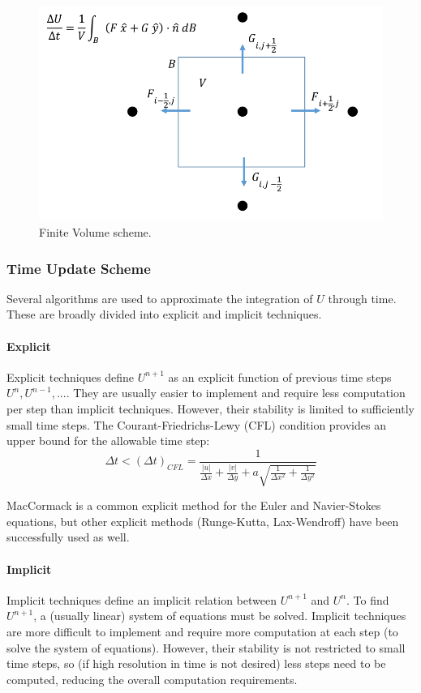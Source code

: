 \documentclass[paper=a4, fontsize=11pt]{scrartcl}
\numberwithin{equation}{section}        %
\numberwithin{figure}{section}          %
\numberwithin{table}{section}               %
\begin{document}
\begin{figure}[H]
    \centering
    \includegraphics[width = 0.8 \textwidth]{figures/finite_volume.png}
    \caption{Finite Volume scheme.}
    \label{fig:finite_volume}
\end{figure}

\subsubsection{Time Update Scheme}
Several algorithms are used to approximate the integration of $U$ through time. These are broadly divided into explicit and implicit techniques.

\paragraph{Explicit}
Explicit techniques define $U^{n+1}$ as an explicit function of previous time steps $U^{n}, U^{n-1}, ...$. They are usually easier to implement and require less computation per step than implicit techniques. However, their stability is limited to sufficiently small time steps. The Courant-Friedrichs-Lewy (CFL) condition provides an upper bound for the allowable time step:
\begin{equation}
    \Delta t < (\Delta t)_{CFL} = \frac{1}{\frac{|u|}{\Delta x} + \frac{|v|}{\Delta y} + a \sqrt{\frac{1}{\Delta x^2} + \frac{1}{\Delta y^2}}}
\end{equation}

MacCormack is a common explicit method for the Euler and Navier-Stokes equations, but other explicit methods (Runge-Kutta, Lax-Wendroff) have been successfully used as well.

\paragraph{Implicit}
Implicit techniques define an implicit relation between $U^{n+1}$ and $U^n$. To find $U^{n+1}$, a (usually linear) system of equations must be solved. Implicit techniques are more difficult to implement and require more computation at each step (to solve the system of equations). However, their stability is not restricted to small time steps, so (if high resolution in time is not desired) less steps need to be computed, reducing the overall computation requirements.\\
\end{document}
